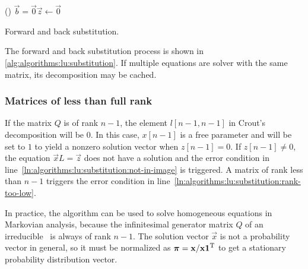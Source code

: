 \begin{algorithm}
  \;
  \lIf()
  {$\vec{b} = \vec{0}$}{$\vec{z} \gets \vec{0}$}
   
  \;
  \caption{Forward and back substitution.}
  \label{alg:algorithms:lu:substitution}
\end{algorithm}

The forward and back substitution process is shown in
\vref{alg:algorithms:lu:substitution}. If multiple equations are
solver with the same matrix, its  decomposition may be
cached.

\subsubsection{Matrices of less than full rank}

If the matrix $Q$ is of rank $n - 1$, the element $l[n - 1, n - 1]$ in
Crout's  decomposition will be $0$. In this case,
$x[n - 1]$ is a free parameter and will be set to $1$ to yield a
nonzero solution vector when $z[n - 1] = 0$. If $z[n - 1] \ne 0$, the
equation $\vec{x} L = \vec{z}$ does not have a solution and the error
condition in line~\ref{ln:algorithms:lu:substitution:not-in-image} is
triggered. A matrix of rank less than $n - 1$ triggers the error
condition in line~\ref{ln:algorithms:lu:substitution:rank-too-low}.

In practice, the algorithm can be used to solve homogeneous equations
in Markovian analysis, because the infinitesimal generator matrix $Q$
of an irreducible \CTMC\ is always of rank $n - 1$. The solution
vector $\vec{x}$ is not a probability vector in general, so it must be
normalized as $\bm{\mathrm{\pi}} = \bm{\mathrm{x}} / \bm{\mathrm{x}} \bm{\mathrm{1}}^{\mathrm{T}}$ to get a
stationary probability distribution vector.

